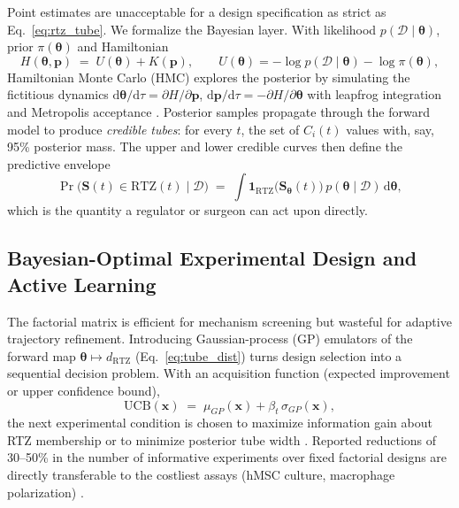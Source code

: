 \documentclass[11pt]{article}
\newcommand{\dd}{\mathrm{d}}
\newcommand{\RZT}{\mathrm{RTZ}}
\begin{document}
Point estimates are unacceptable for a design specification as strict as Eq.~\eqref{eq:rtz_tube}. We formalize the Bayesian layer. With likelihood $p(\mathcal{D}\mid\boldsymbol{\theta})$, prior $\pi(\boldsymbol{\theta})$ and Hamiltonian
\begin{equation}
H(\boldsymbol{\theta},\mathbf{p}) \;=\; U(\boldsymbol{\theta}) + K(\mathbf{p}),\qquad
U(\boldsymbol{\theta})=-\log p(\mathcal{D}\mid\boldsymbol{\theta})-\log\pi(\boldsymbol{\theta}),
\label{eq:hmc_hamiltonian}
\end{equation}
Hamiltonian Monte Carlo (HMC) explores the posterior by simulating the fictitious dynamics $\dd\boldsymbol{\theta}/\dd\tau=\partial H/\partial\mathbf{p}$, $\dd\mathbf{p}/\dd\tau=-\partial H/\partial\boldsymbol{\theta}$ with leapfrog integration and Metropolis acceptance \cite{Salvatier2016,Carpenter2017}. Posterior samples propagate through the forward model to produce \emph{credible tubes}: for every $t$, the set of $C_i(t)$ values with, say, 95\% posterior mass. The upper and lower credible curves then define the predictive envelope
\begin{equation}
\Pr\bigl(\mathbf{S}(t)\in \RZT(t)\mid\mathcal{D}\bigr) \;=\; \int \mathbf{1}_{\RZT}\bigl(\hat{\mathbf{S}}_{\boldsymbol{\theta}}(t)\bigr)\,p(\boldsymbol{\theta}\mid\mathcal{D})\,\dd\boldsymbol{\theta},
\label{eq:rtz_prob}
\end{equation}
which is the quantity a regulator or surgeon can act upon directly.


\subsection{Bayesian-Optimal Experimental Design and Active Learning}


The factorial matrix is efficient for mechanism screening but wasteful for adaptive trajectory refinement. Introducing Gaussian-process (GP) emulators of the forward map $\boldsymbol{\theta}\mapsto d_{\RZT}$ (Eq.~\eqref{eq:tube_dist}) turns design selection into a sequential decision problem. With an acquisition function (expected improvement or upper confidence bound),
\begin{equation}
\mathrm{UCB}(\mathbf{x})\;=\;\mu_{GP}(\mathbf{x}) + \beta_t\,\sigma_{GP}(\mathbf{x}),
\label{eq:ucb}
\end{equation}
the next experimental condition is chosen to maximize information gain about RTZ membership or to minimize posterior tube width \cite{Snoek2012,Shahriari2016}. Reported reductions of 30--50\% in the number of informative experiments over fixed factorial designs are directly transferable to the costliest assays (hMSC culture, macrophage polarization) \cite{Workie2020, Shahriari2016}.
\end{document}

